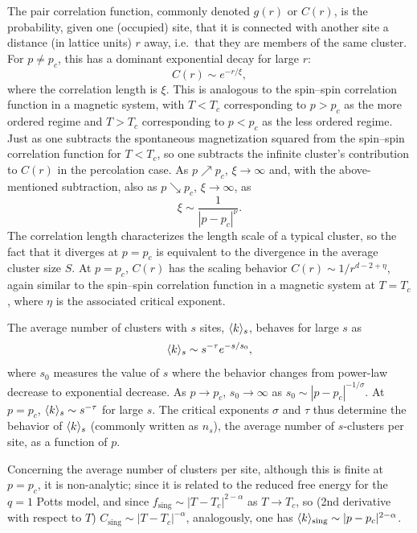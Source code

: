 The pair correlation function, commonly denoted $g(r)$ or $C(r)$, is the probability, given one (occupied) site, that it is
connected with another site a distance (in lattice units) $r$ away, i.e.\ that they are members of the same cluster. For
$p\ne p_c$, this has a dominant exponential decay for large $r$:
\begin{equation}
  C(r)\sim e^{-r/\xi},
\end{equation}
where the correlation length is $\xi$. This is analogous to the spin--spin correlation function in a magnetic system, with
$T<T_c$ corresponding to $p>p_c$ as the more ordered regime and $T>T_c$ corresponding to $p<p_c$ as the less ordered regime.
Just as one subtracts the spontaneous magnetization squared from the spin--spin correlation function for $T<T_c$, so one
subtracts the infinite cluster's contribution to $C(r)$ in the percolation case. As $p\nearrow p_c$, $\xi\to\infty$ and, with
the above-mentioned subtraction, also as $p\searrow p_c$, $\xi\to\infty$, as
\begin{equation}
  \xi\sim\frac{1}{|p-p_c|^\nu}.
\end{equation}
The correlation length characterizes the length scale of a typical cluster, so the fact that it diverges at $p = p_c$ is
equivalent to the divergence in the average cluster size $S$. At $p = p_c$, $C(r)$ has the scaling behavior
$C(r)\sim1/r^{d-2+\eta}$, again similar to the spin--spin correlation function in a magnetic system at $T = T_c$,
where $\eta$ is the associated critical exponent.

The average number of clusters with $s$ sites, $\langle k\rangle_s$, behaves for large $s$ as
\begin{equation}
  \langle k\rangle_s\sim s^{-\tau}e^{-s/s_0},
\end{equation}
where $s_0$ measures the value of $s$ where the behavior changes from power-law decrease to exponential decrease. As
$p\to p_c$, $s_0\to\infty$ as $s_0\sim|p-p_c|^{-1/\sigma}$. At $p = p_c$, $\langle k\rangle_s\sim s^{-\tau}$ for large $s$. The critical
exponents $\sigma$ and $\tau$ thus determine the behavior of $\langle k\rangle_s$ (commonly written as $n_s$), the average number of
$s$-clusters per site, as a function of $p$.

Concerning the average number of clusters per site, although this is finite at $p = p_c$, it is non-analytic; since it is
related to the reduced free energy for the $q = 1$ Potts model, and since $f_{\text{sing}}\sim|T-T_c|^{2-\alpha}$ as
$T\to T_c$, so (2nd derivative with respect to $T$) $C_{\text{sing}}\sim|T-T_c|^{-\alpha}$, analogously, one has
$\langle k\rangle_{\text{sing}}\sim|p-p_c|^{2-\alpha}$.

